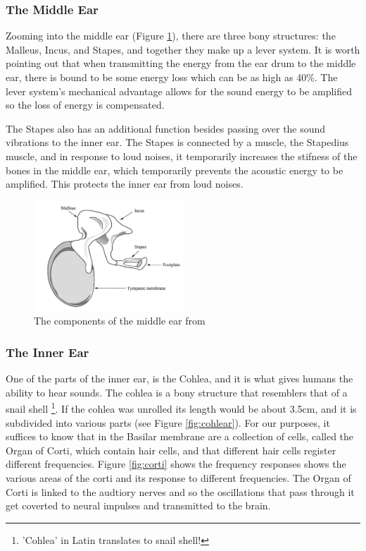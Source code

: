 \documentclass[logo,bsc,singlespacing,parskip,online]{infthesis}
\begin{document}
\subsubsection{The Middle Ear}
Zooming into the middle ear (Figure \ref{fig:middle-ear}), there are three bony structures: the Malleus, Incus, and Stapes,
and together they make up a lever system. 
It is worth pointing out that when transmitting the energy from the ear drum to the middle ear, there is bound to be some energy 
loss which can be as high as 40\%. The lever system's mechanical advantage 
allows for the sound energy to be amplified so the loss of energy is compensated. 

The Stapes also has an additional function besides passing over the sound vibrations to the inner ear. The Stapes 
is connected by a muscle, the Stapedius muscle, and in response to loud noises, it temporarily increases the stifness
of the bones in the middle ear, which temporarily prevents the acoustic energy to be amplified. This 
protects the inner ear from loud noises.

\begin{figure}[h]
   \centering
   \includegraphics[width=0.5\textwidth]{wayland-middle-ear.png}
   \caption{The components of the middle ear from \citet{Wayland2018Phonetics}}
   \label{fig:middle-ear}
\end{figure}

\subsubsection{The Inner Ear}
One of the parts of the inner ear, is the Cohlea, and it is what gives humans the ability to hear sounds.
The cohlea is a bony structure that resemblers that of a snail shell \footnote{'Cohlea' in Latin translates to snail shell!}.
If the cohlea was unrolled its length would be about 3.5cm, and it is subdivided into various parts (see Figure \ref{fig:cohlear}).
For our purposes, it suffices to know that in the Basilar membrane are a collection of cells, called 
the Organ of Corti, which contain hair cells, and that different hair cells register different frequencies.
Figure \ref{fig:corti} shows the frequency responses shows the various areas of the corti 
and its response to different frequencies. The Organ of Corti is linked to the audtiory nerves and 
so the oscillations that pass through it get coverted to neural impulses and transmitted to the brain.
\end{document}
